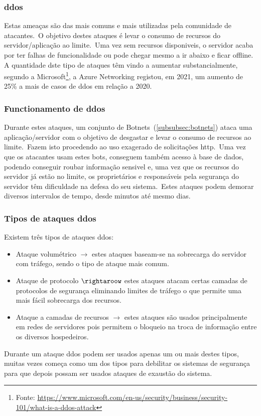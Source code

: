 \documentclass{report}
\begin{document}
\subsubsection{\large \ac{ddos}}
\label{subsubsec:ddos}
Estas ameaças são das mais comuns e mais utilizadas pela comunidade de atacantes.\ O objetivo destes ataques é levar o consumo de recursos do servidor/aplicação ao limite.\ Uma vez sem recursos disponiveis, o servidor acaba por ter falhas de funcionalidade ou pode chegar mesmo a ir abaixo e ficar offline.\\
A quantidade dste tipo de ataques têm vindo a aumentar substancialmente, segundo a Microsoft\footnote{Fonte: \url{https://www.microsoft.com/en-us/security/business/security-101/what-is-a-ddos-attack}}, a Azure Networking registou, em 2021, um aumento de 25\% a mais de casos de \ac{ddos} em relação a 2020.

\subsubsection{Functionamento de \ac{ddos}}
Durante estes ataques, um conjunto de Botnets~(\ref{subsubsec:botnets}) ataca uma aplicação/servidor com o objetivo de desgastar e levar o consumo de recursos ao limite.\ Fazem isto procedendo ao uso exagerado de solicitações \ac{http}.\ Uma vez que os atacantes usam estes bots, conseguem também acesso à base de dados, podendo conseguir roubar informação sensivel e, uma vez que os recursos do servidor já estão no limite, os proprietários e responsáveis pela segurança do servidor têm dificuldade na defesa do seu sistema.\ Estes ataques podem demorar diversos intervalos de tempo, desde minutos até mesmo dias.

\subsubsection{Tipos de ataques \ac{ddos}}
Existem três tipos de ataques \ac{ddos}:
\begin{itemize}
    \item Ataque volumétrico $\rightarrow$ estes ataques baseam-se na sobrecarga do servidor com tráfego, sendo o tipo de ataque mais comum.
    \item Ataque de protocolo $\rightaroow$ estes ataques atacam certas camadas de protocolos de segurança eliminando limites de tráfego o que permite uma mais fácil sobrecarga dos recursos.
    \item Ataque a camadas de recursos $\rightarrow$ estes ataques são usados principalmente em redes de servidores pois permitem o bloqueio na troca de informação entre os diversos hospedeiros.
\end{itemize}
Durante um ataque \ac{ddos} podem ser usados apenas um ou mais destes tipos, muitas vezes começa como um dos tipos para debilitar os sistemas de segurança para que depois possam ser usados ataques de exaustão do sistema.
\end{document}
